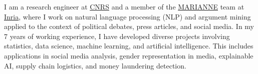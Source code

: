 \documentclass[10pt,a4paper,ragged2e,withhyper]{altacv}
\begin{document}

\makecvheader

\begin{justify}
\vspace{-1em}
I am a research engineer at \href{https://www.cnrs.fr/en}{CNRS} and a member of the \href{https://team.inria.fr/marianne/}{MARIANNE} team at \href{https://inria.fr/en}{Inria}, where I work on natural language processing (NLP) and argument mining applied to the context of political debates, press articles, and social media.
In my 7 years of working experience, I have developed diverse projects involving statistics, data science, machine learning, and artificial intelligence.
This includes applications in social media analysis, gender representation in media, explainable AI, supply chain logistics, and money laundering detection.
\end{justify}
\end{document}
